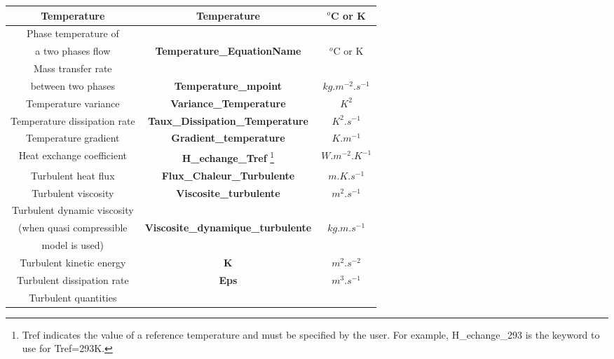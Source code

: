 \begin{itemize}
\begin{longtable}[hcr]{|c|c|c|}
Temperature                                     & \textbf{Temperature}                      & $^o$C or K \\ \hline
Phase temperature of                            &                                           & \\
a two phases flow                               & \textbf{Temperature\_EquationName}        & $^o$C or K \\ \hline
Mass transfer rate                              &                                           & \\
between two phases                              & \textbf{Temperature\_mpoint}              & $kg.m^{-2}.s^{-1}$ \\ \hline
Temperature variance                            & \textbf{Variance\_Temperature}            & $K^2$ \\ \hline
Temperature dissipation rate                    & \textbf{Taux\_Dissipation\_Temperature}   & $K^2.s^{-1}$ \\ \hline
Temperature gradient                            & \textbf{Gradient\_temperature}            & $K.m^{-1}$ \\ \hline
Heat exchange coefficient                       & \textbf{H\_echange\_Tref} \footnote{Tref indicates the value of a reference temperature and must be specified by the user. For example, H\_echange\_293 is the keyword to use for Tref=293K.}            & $W.m^{-2}.K^{-1}$ \\ \hline
Turbulent heat flux                             & \textbf{Flux\_Chaleur\_Turbulente}        & $m.K.s^{-1}$ \\ \hline
Turbulent viscosity                             & \textbf{Viscosite\_turbulente}            & $m^2.s^{-1}$ \\ \hline
Turbulent dynamic viscosity                     &                                           & \\
(when quasi compressible                        & \textbf{Viscosite\_dynamique\_turbulente} & $kg.m.s^{-1}$ \\
 model is used)                                 &                                           & \\ \hline
Turbulent kinetic energy                        & \textbf{K}                                & $m^2.s^{-2}$ \\ \hline
Turbulent dissipation rate                      & \textbf{Eps}                              & $m^3.s^{-1}$ \\ \hline
Turbulent quantities                            &                                           & \\

\end{longtable}
\end{itemize}
